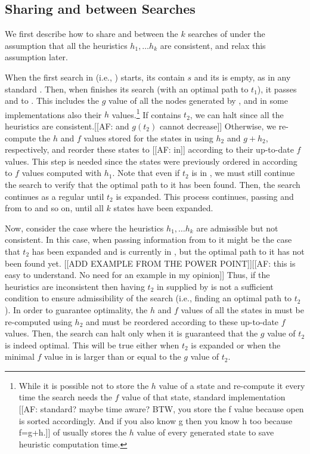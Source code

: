 

\subsection{Sharing \open and \closed between Searches}

We first describe how to share \open and \closed between the $k$ \astar searches of \kxastar under the assumption that all the heuristics $h_1, \ldots h_k$ are consistent, and relax this assumption later.

When the first \astar search in \kxastar (i.e., ) starts, its \open contain $s$ and its \closed is empty, as in any standard \astar.
Then, when  finishes its search (with an optimal path to $t_1$), it passes \open and \closed to .
This includes the $g$ value of all the nodes generated by , and in some implementations also their $h$ values.\footnote{While it is possible not to store the $h$ value of a state and re-compute it every time the search needs the $f$ value of that state, standard implementation [[AF: standard? maybe time aware? BTW, you store the f value because open is sorted accordingly. And if you also know g then you know h too because f=g+h.]] of \astar usually stores the $h$ value of every generated state to save heuristic computation time.} 
If \closed contains $t_2$, we can halt since all the heuristics are consistent.[[AF: and $g(t_2)$ cannot decrease]]
Otherwise, we re-compute the $h$ and $f$ values stored for the states in \open using $h_2$ and $g+h_2$, respectively, and reorder these states to [[AF: in]] \open according to their up-to-date $f$ values.
This step is needed since the states were previously ordered in \open according to $f$ values computed with $h_1$.
Note that even if $t_2$ is in \open, we must still continue the search to verify that the optimal path to it has been found.
Then, the search continues as a regular \astar until $t_2$ is expanded.
This process continues, passing \open and \closed from  to  and so on, until all $k$ states have been expanded.

Now, consider the case where the heuristics $h_1, \ldots h_k$ are admissible but not consistent.
In this case, when passing information from  to  it might be the case that $t_2$ has been expanded and is currently in \closed, but the optimal path to it has not been found yet.
[[ADD EXAMPLE FROM THE POWER POINT]][[AF: this is easy to understand. No need for an example in my opinion]]
Thus, if the heuristics are inconsistent then having $t_2$ in \closed supplied by  is not a sufficient condition to ensure admissibility of the search (i.e., finding an optimal path to $t_2$).
In order to guarantee optimality, the $h$ and $f$ values of all the states in \open must be re-computed using $h_2$ and \open must be reordered according to these up-to-date $f$ values.
Then, the search can halt only when it is guaranteed that the $g$ value of $t_2$ is indeed optimal. This will be true either when $t_2$ is expanded or when the minimal $f$ value in \open is larger than or equal to the $g$ value of $t_2$.

